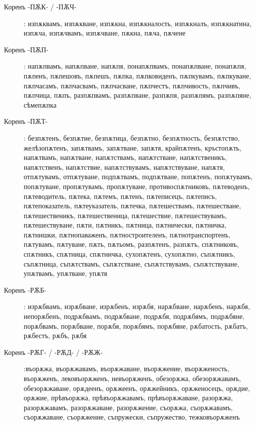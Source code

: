 \documentclass{article}
\begin{document}
\begin{description}
		\item[Коренъ -ПѪК- / -ПѪЧ-]: изпѫквамъ, изпѫкване, изпѫкна, изпѫкналость, изпѫкналъ, изпѫкнатина, изпѫча, изпѫчвамъ, изпѫчване, пѫкна, пѫча, пѫчене
		
		\item[Коренъ -ПѪП-]: напѫпвамъ, напѫпване, напѫпя, понапѫпвамъ, понапѫпване, понапѫпя, пѫпенъ, пѫпешовъ, пѫпешъ, пѫпка, пѫпковиденъ, пѫпкувамъ, пѫпкуване, пѫпчасамъ, пѫпчасвамъ, пѫпчасване, пѫпчестъ, пѫпчивость, пѫпчивъ, пѫпчица, пѫпъ, разпѫпвамъ, разпѫпване, разпѫпя, разпѫпямъ, разпѫпяне, сѣмепѫпка
		
		\item[Коренъ -ПѪТ-]: безпѫтенъ, безпѫтие, безпѫтица, безпѫтно, безпѫтность, безпѫтство, желѣзопѫтенъ, запѫтвамъ, запѫтване, запѫтя, крайпѫтенъ, кръстопѫть, напѫтвамъ, напѫтване, напѫтствамъ, напѫтстване, напѫтственикъ, напѫтственъ, напѫтствие, напѫтствувамъ, напѫтствуване, напѫтя, отпѫтувамъ, отпѫтуване, подпѫтвамъ, подпѫтване, попѫтенъ, попѫтувамъ, попѫтуване, пропѫтувамъ, пропѫтуване, противоспѫтниковъ, пѫтеводенъ, пѫтеводитель, пѫтека, пѫтемъ, пѫтенъ, пѫтеписецъ, пѫтеписъ, пѫтепоказатель, пѫтеуказатель, пѫтечка, пѫтешествамъ, пѫтешестване, пѫтешественикъ, пѫтешественица, пѫтешествие, пѫтешествувамъ, пѫтешествуване, пѫти, пѫтникъ, пѫтница, пѫтнически, пѫтничка, пѫтнишки, пѫтнопаваженъ, пѫтностроителенъ, пѫтнотранспортенъ, пѫтувамъ, пѫтуване, пѫть, пѫтьомъ, разпѫтенъ, разпѫтъ, спѫтниковъ, спѫтникъ, спѫтница, спѫтничка, сухопѫтенъ, сухопѫтно, съпѫтникъ, съпѫтница, съпѫтствамъ, съпѫтстване, съпѫтствувамъ, съпѫтствуване, упѫтвамъ, упѫтване, упѫтя
		
		\item[Коренъ -РѪБ-]: изрѫбвамъ, изрѫбване, изрѫбенъ, изрѫбя, нарѫбване, нарѫбенъ, нарѫбя, непорѫбенъ, подрѫбвамъ, подрѫбване, подрѫбя, подрѫбямъ, подрѫбяне, порѫбвамъ, порѫбване, порѫбя, порѫбямъ, порѫбяне, рѫбатость, рѫбатъ, рѫбестъ, рѫбъ, рѫбя
		
		\item[Коренъ -РѪГ- / -РѪД- / -РѪЖ-]:въорѫжа, въорѫжавамъ, въорѫжаване, въорѫжение, въорѫженость, въорѫженъ, лековъорѫженъ, невъорѫженъ, обезорѫжа, обезорѫжавамъ, обезорѫжаване, орѫдеенъ, орѫжеенъ, орѫжейникъ, орѫженосецъ, орѫдие, орѫжие, прѣвъорѫжа, прѣвъорѫжавамъ, прѣвъорѫжаване, разорѫжа, разорѫжавамъ, разорѫжаване, разорѫжение, съорѫжа, съорѫжавамъ, съорѫжаване, съорѫжение, съпружески, съпружество, тежковъорѫженъ %
		

\end{description}
\end{document}
